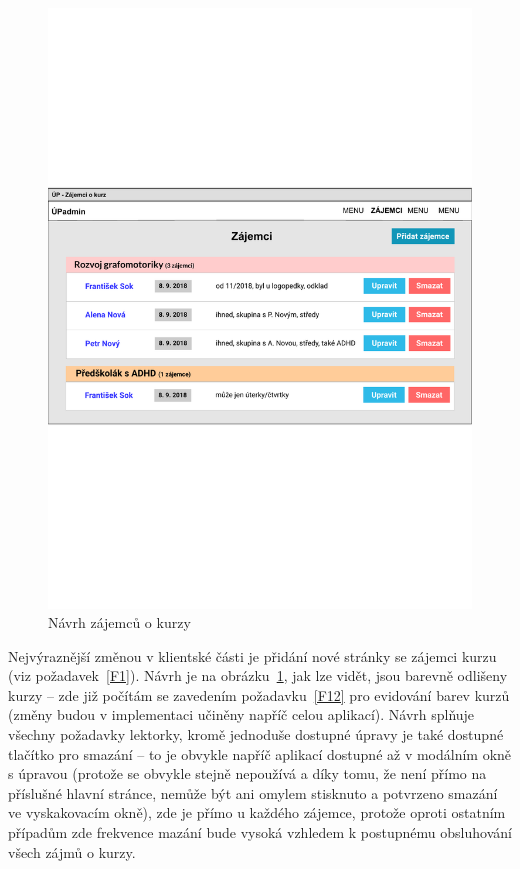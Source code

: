 \begin{figure}[h]\centering
    \includegraphics[width=1\textwidth]{img/ui-zajemci}
    \caption{Návrh zájemců o kurzy}\label{fig:ui-zajemci}
\end{figure}

Nejvýraznější změnou v klientské části je přidání nové stránky se zájemci kurzu (viz požadavek~\ref{F1}). Návrh je na obrázku~\ref{fig:ui-zajemci}, jak lze vidět, jsou barevně odlišeny kurzy -- zde již počítám se zavedením požadavku~\ref{F12} pro evidování barev kurzů (změny budou v implementaci učiněny napříč celou aplikací). Návrh splňuje všechny požadavky lektorky, kromě jednoduše dostupné úpravy je také dostupné tlačítko pro smazání -- to je obvykle napříč aplikací dostupné až v modálním okně s úpravou (protože se obvykle stejně nepoužívá a díky tomu, že není přímo na příslušné hlavní stránce, nemůže být ani omylem stisknuto a potvrzeno smazání ve vyskakovacím okně), zde je přímo u každého zájemce, protože oproti ostatním případům zde frekvence mazání bude vysoká vzhledem k postupnému obsluhování všech zájmů o kurzy.

